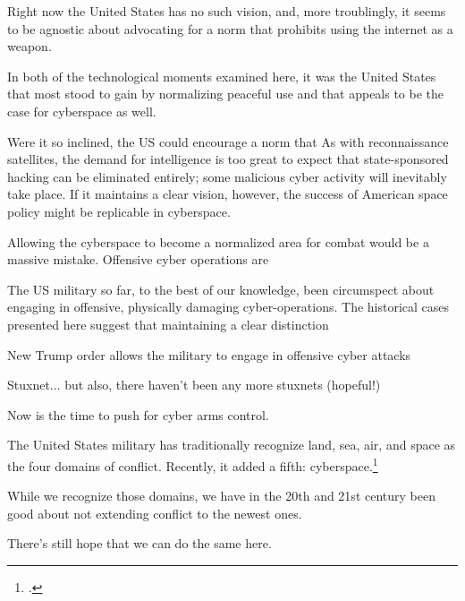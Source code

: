 \documentclass[11pt]{memoir}
\begin{document}
Right now the United States has no such vision, and, more troublingly, it seems to be agnostic about advocating for a norm that prohibits using the internet as a weapon.


In both of the technological moments examined here, it was the United States that most stood to gain by normalizing peaceful use and that appeals to be the case for cyberspace as well.







Were it so inclined, the US could encourage a norm that  As with reconnaissance satellites, the demand for intelligence is too great to expect that state-sponsored hacking can be eliminated entirely; some malicious cyber activity will inevitably take place. If it maintains a clear vision, however, the success of American space policy might be replicable in cyberspace.

Allowing the cyberspace to become a normalized area for combat would be a massive mistake. Offensive cyber operations are

The US military so far, to the best of our knowledge, been circumspect about engaging in offensive, physically damaging cyber-operations. The historical cases presented here suggest that maintaining a clear distinction

New Trump order allows the military to engage in offensive cyber attacks

Stuxnet... but also, there haven't been any more stuxnets (hopeful!)

Now is the time to push for cyber arms control.


The United States military has traditionally recognize land, sea, air, and space as the four domains of conflict. Recently, it added a fifth: cyberspace.\footcite{carafano_americas_2018}

While we recognize those domains, we have in the 20th and 21st century been good about not extending conflict to the newest ones.

There's still hope that we can do the same here.
\end{document}
